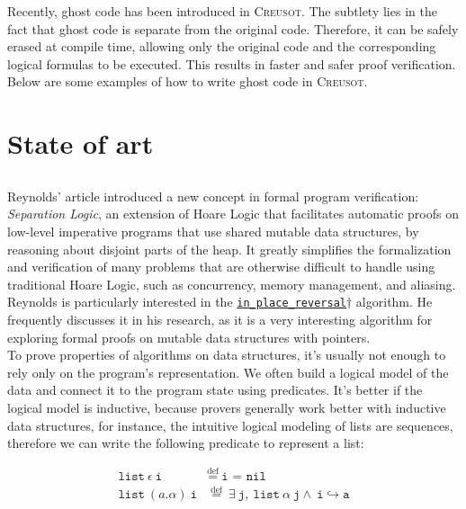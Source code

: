 \documentclass[11pt,a4paper]{report}
\begin{document}
Recently, ghost code has been introduced in \textsc{Creusot}. The subtlety lies in the fact that ghost code is separate from the original code. Therefore, it can be safely erased at compile time, allowing only the original code and the corresponding logical formulas to be executed. This results in faster and safer proof verification. Below are some examples of how to write ghost code in \textsc{Creusot}.

\hypertarget{ghostcode}{}

\chapter{State of art}

\section{}
Reynolds' article introduced a new concept in formal program verification: \emph{Separation Logic}, an extension of Hoare Logic that facilitates automatic proofs on low-level imperative programs that use shared mutable data structures, by reasoning about disjoint parts of the heap. It greatly simplifies the formalization and verification of many problems that are otherwise difficult to handle using traditional Hoare Logic, such as concurrency, memory management, and aliasing.
\\

Reynolds is particularly interested in the \hyperlink{reversal}{\texttt{in\_place\_reversal}$\dagger$} algorithm. He frequently discusses it in his research, as it is a very interesting algorithm for exploring formal proofs on mutable data structures with pointers.
\\

To prove properties of algorithms on data structures, it's usually not enough to rely only on the program's representation. We often build a logical model of the data and connect it to the program state using predicates. It's better if the logical model is inductive, because provers generally work better with inductive data structures, for instance, the intuitive logical modeling of lists are sequences, therefore we can write the following predicate to represent a list:


\begin{align}
\texttt{list}\ \epsilon\ \texttt{i} &\overset{\text{def}}{=}\ \texttt{i = nil} \\
\texttt{list}\ (a.\alpha)\ \texttt{i} &\overset{\text{def}}{=}\ \exists\ \texttt{j},\ \texttt{list}\ \alpha\ \texttt{j} \land\ \texttt{i} \hookrightarrow \texttt{a}
\end{align}
\end{document}
